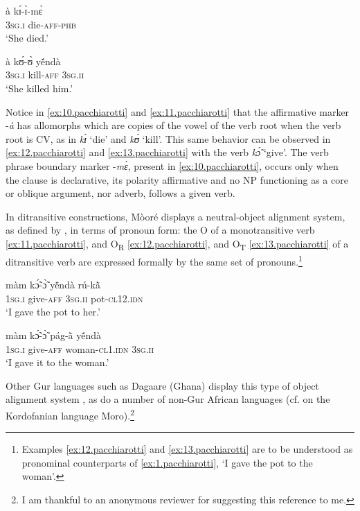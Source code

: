 \documentclass[output=paper]{langsci/langscibook}
\begin{document}
\ea
\label{ex:10.pacchiarotti}
\gll \`{a}    kɪ́-ɪ̀-mɛ̀      \\     
\textsc{3sg.i} die-\textsc{aff-phb} \\
\glt`She died.'
\z 

\ea
\label{ex:11.pacchiarotti}
\gll \`{a}    kʊ́-ʊ̀    yẽ́nd\`{a}\\
\textsc{3sg.i}    kill-\textsc{aff}  \textsc{3sg.ii}\\
\glt`She killed him.'
\z

Notice in \ref{ex:10.pacchiarotti} and \ref{ex:11.pacchiarotti} that the affirmative marker -\textit{\`{a}} has allomorphs which are copies of the vowel of the verb root when the verb root is CV, as in \textit{kɪ́} `die' and \textit{kʊ́} `kill'. This same behavior can be observed in \ref{ex:12.pacchiarotti} and \ref{ex:13.pacchiarotti} with the verb \textit{k\'{\~{ɔ}}} `give'. The verb phrase boundary marker -\textit{mɛ̀}, present in \ref{ex:10.pacchiarotti}, occurs only when the clause is declarative, its polarity affirmative and no NP functioning as a core or oblique argument, nor adverb, follows a given verb.  

In ditransitive constructions, Mòoré displays a neutral-object alignment system, as defined by \citet{malchukovetal2010}, in terms of pronoun form: the O of a monotransitive verb \ref{ex:11.pacchiarotti}, and O\textsubscript{R} \ref{ex:12.pacchiarotti}, and O\textsubscript{T} \ref{ex:13.pacchiarotti} of a ditransitive verb are expressed formally by the same set of pronouns.\footnote{Examples \ref{ex:12.pacchiarotti} and \ref{ex:13.pacchiarotti} are to be understood as pronominal counterparts of \ref{ex:1.pacchiarotti}, `I gave the pot to the woman'.} 

\ea
\label{ex:12.pacchiarotti}
\gll m\`{a}m    kɔ̃́-ɔ̃̀      y\'{\~{e}}nd\`{a}    r\'{u}-k\`{\~{a}}\\
\textsc{1sg.i  }  give-\textsc{aff}    \textsc{3sg.ii  }  pot\textsc{-cl12.idn} \\
\glt `I gave the pot to her.'
\z

\ea
\label{ex:13.pacchiarotti}
\gll m\`{a}m    kɔ̃́-ɔ̃̀    p\'{a}g-\`{\~{a}}      y\'{\~{e}}nd\`{a}\\
\textsc{1sg.i  }  give-\textsc{aff}  woman-\textsc{cl1.idn}  \textsc{3sg.ii} \\
\glt `I gave it to the woman.'
\z

Other Gur languages such as Dagaare (Ghana) display this type of object alignment system \citep{bodomo1997}, as do a number of non-Gur African languages (cf. \citealt{ackermanetaltoappear} on the Kordofanian language Moro).\footnote{I am thankful to an anonymous reviewer for suggesting this reference to me.}
\end{document}
